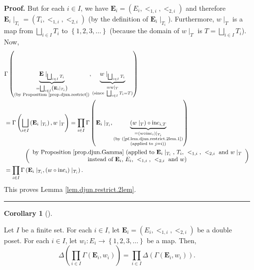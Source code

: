 \documentclass[numbers=enddot,12pt,final,onecolumn,notitlepage,abstracton]{scrartcl}
\theoremstyle{definition}
\newtheorem{coro}[theo]{Corollary}
\newenvironment{corollary}[1][]
{\begin{coro}[#1]\begin{leftbar}}
{\end{leftbar}\end{coro}}
\newenvironment{proof}[1][Proof]{\noindent\textbf{#1.} }{\ \rule{0.5em}{0.5em}}
\let\prodnonlimits\prod
\renewcommand{\prod}{\prodnonlimits\limits}
\newenvironment{verlong}{}{}
\begin{document}
\begin{verlong}
\begin{footnotesize}
\begin{proof}
But for each $i\in I$, we have $\mathbf{E}_{i}=\left(  E_{i},<_{1,i}%
,<_{2,i}\right)  $ and therefore $\mathbf{E}_{i}\mid_{T_{i}}=\left(
T_{i},<_{1,i},<_{2,i}\right)  $ (by the definition of $\mathbf{E}_{i}%
\mid_{T_{i}}$). Furthermore, $w\mid_{T}$ is a map from $\bigsqcup_{i\in
I}T_{i}$ to $\left\{  1,2,3,\ldots\right\}  $ (because the domain of
$w\mid_{T}$ is $T=\bigsqcup_{i\in I}T_{i}$). Now,%
\begin{align*}
&  \Gamma\left(  \underbrace{{\mathbf{E}}\mid_{\bigsqcup_{i\in I}T_{i}}%
}_{\substack{=\bigsqcup_{i\in I}\left(  \mathbf{E}_{i}\mid_{T_{i}}\right)
\\\text{(by Proposition \ref{prop.djun.restrict})}}},\underbrace{w\mid
_{\bigsqcup_{i\in I}T_{i}}}_{\substack{=w\mid_{T}\\\text{(since }%
\bigsqcup_{i\in I}T_{i}=T\text{)}}}\right) \\
&  =\Gamma\left(  \bigsqcup_{i\in I}\left(  \mathbf{E}_{i}\mid_{T_{i}}\right)
,w\mid_{T}\right)  =\prod_{i\in I}\Gamma\left(  \mathbf{E}_{i}\mid_{T_{i}%
},\underbrace{\left(  w\mid_{T}\right)  \circ\operatorname*{inc}%
\nolimits_{i,T}}_{\substack{=\left(  w\circ\operatorname*{inc}\nolimits_{i}%
\right)  \mid_{T_{i}}\\\text{(by (\ref{pf.lem.djun.restrict.2lem.1}%
)}\\\text{(applied to }j=i\text{))}}}\right) \\
&  \ \ \ \ \ \ \ \ \ \ \left(
\begin{array}
[c]{c}%
\text{by Proposition \ref{prop.djun.Gamma} (applied to }\mathbf{E}_{i}%
\mid_{T_{i}}\text{, }T_{i}\text{, }<_{1,i}\text{, }<_{2,i}\text{ and }%
w\mid_{T}\\
\text{instead of }\mathbf{E}_{i}\text{, }E_{i}\text{, }<_{1,i}\text{, }%
<_{2,i}\text{ and }w \text{)}%
\end{array}
\right) \\
&  =\prod_{i\in I}\Gamma\left(  \mathbf{E}_{i}\mid_{T_{i}},\left(
w\circ\operatorname*{inc}\nolimits_{i}\right)  \mid_{T_{i}}\right)  .
\end{align*}
This proves Lemma \ref{lem.djun.restrict.2lem}.
\end{proof}

\Needspace{3cm}

\begin{corollary}
\label{cor.djun.restrict.2}Let $I$ be a finite set. For each $i\in I$, let
$\mathbf{E}_{i}=\left(  E_{i},<_{1,i},<_{2,i}\right)  $ be a double poset. For
each $i\in I$, let $w_{i}:E_{i}\rightarrow\left\{  1,2,3,\ldots\right\}  $ be
a map. Then,%
\[
\Delta\left(  \prod_{i\in I}\Gamma\left(  \mathbf{E}_{i},w_{i}\right)
\right)  =\prod_{i\in I}\Delta\left(  \Gamma\left(  \mathbf{E}_{i}%
,w_{i}\right)  \right)  .
\]


\end{corollary}
\end{footnotesize}
\end{verlong}
\end{document}
